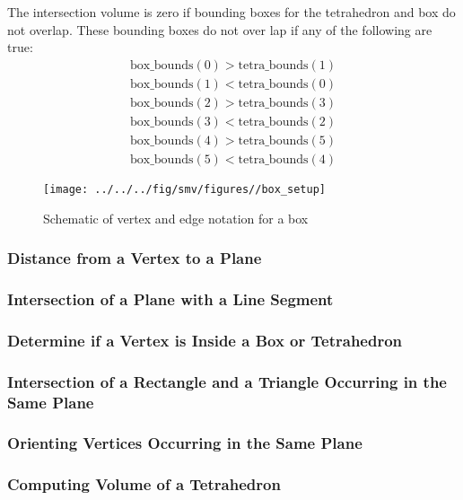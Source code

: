 \documentclass[12pt]{article}
\begin{document}
\noindent The intersection volume is zero if bounding boxes for the tetrahedron and box do not overlap.
These bounding boxes do not over lap if any of the following are true:
\begin{eqnarray*}
\mbox{box\_bounds}(0)>\mbox{tetra\_bounds}(1) \\
\mbox{box\_bounds}(1)<\mbox{tetra\_bounds}(0) \\
\mbox{box\_bounds}(2)>\mbox{tetra\_bounds}(3) \\
\mbox{box\_bounds}(3)<\mbox{tetra\_bounds}(2) \\
\mbox{box\_bounds}(4)>\mbox{tetra\_bounds}(5) \\
\mbox{box\_bounds}(5)<\mbox{tetra\_bounds}(4)
\end{eqnarray*}

\begin{figure}
\begin{center}
\texttt{[image: ../../../fig/smv/figures//box\_setup]}
\end{center}
\caption{Schematic of vertex and edge notation for a box}
\label{figure:box_setup}
\end{figure}

\subsubsection{Distance from a Vertex to a Plane}
\subsubsection{Intersection of a Plane with a Line Segment}
\subsubsection{Determine if a Vertex is Inside a Box or Tetrahedron}
\subsubsection{Intersection of a Rectangle and a Triangle Occurring in the Same Plane}
\subsubsection{Orienting Vertices Occurring in the Same Plane}
\subsubsection{Computing Volume of a Tetrahedron}
\end{document}
